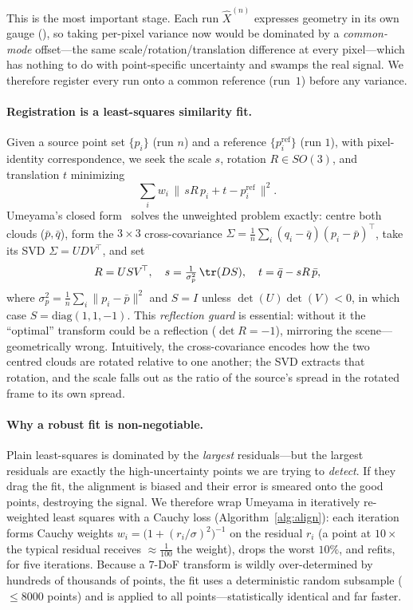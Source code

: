 This is the most important stage. Each run $\hat X^{(n)}$ expresses geometry in its own gauge
(), so taking per-pixel variance now would be dominated by a \emph{common-mode}
offset---the same scale/rotation/translation difference at every pixel---which has nothing to do with
point-specific uncertainty and swamps the real signal. We therefore register every run onto a common
reference (run~$1$) before any variance.

\paragraph{Registration is a least-squares similarity fit.} Given a source point set $\{p_i\}$ (run
$n$) and a reference $\{p_i^{\mathrm{ref}}\}$ (run $1$), with pixel-identity correspondence, we seek
the scale $s$, rotation $R\in SO(3)$, and translation $t$ minimizing
\begin{equation}
\textstyle \sum_i w_i \, \big\lVert\, sR\,p_i + t - p_i^{\mathrm{ref}} \,\big\rVert^2 .
\label{eq:umeyama-obj}
\end{equation}
Umeyama's closed form~\cite{umeyama} solves the unweighted problem exactly: centre both clouds
($\bar p,\bar q$), form the $3{\times}3$ cross-covariance $\Sigma = \tfrac1n\sum_i (q_i{-}\bar q)(p_i
{-}\bar p)^{\!\top}$, take its SVD $\Sigma = U D V^{\!\top}$, and set
\begin{equation}
R = U S V^{\!\top},\quad
s = \tfrac{1}{\sigma_p^2}\,\tr(D S),\quad
t = \bar q - sR\,\bar p,
\label{eq:umeyama-sol}
\end{equation}
where $\sigma_p^2 = \tfrac1n\sum_i\lVert p_i-\bar p\rVert^2$ and $S = I$ unless
$\det(U)\det(V) < 0$, in which case $S = \mathrm{diag}(1,1,-1)$. This \emph{reflection guard} is
essential: without it the ``optimal'' transform could be a reflection ($\det R = -1$), mirroring the
scene---geometrically wrong. Intuitively, the cross-covariance encodes how the two centred clouds are
rotated relative to one another; the SVD extracts that rotation, and the scale falls out as the ratio
of the source's spread in the rotated frame to its own spread.

\paragraph{Why a robust fit is non-negotiable.} Plain least-squares is dominated by the
\emph{largest} residuals---but the largest residuals are exactly the high-uncertainty points we are
trying to \emph{detect}. If they drag the fit, the alignment is biased and their error is smeared
onto the good points, destroying the signal. We therefore wrap Umeyama in iteratively re-weighted
least squares with a Cauchy loss (Algorithm~\ref{alg:align}): each iteration forms Cauchy weights
$w_i = \big(1+(r_i/\sigma)^2\big)^{-1}$ on the residual $r_i$ (a point at $10\times$ the typical
residual receives $\approx\tfrac{1}{100}$ the weight), drops the worst $10\%$, and refits, for five
iterations. Because a $7$-DoF transform is wildly over-determined by hundreds of thousands of points,
the fit uses a deterministic random subsample ($\le 8000$ points) and is applied to all
points---statistically identical and far faster.

